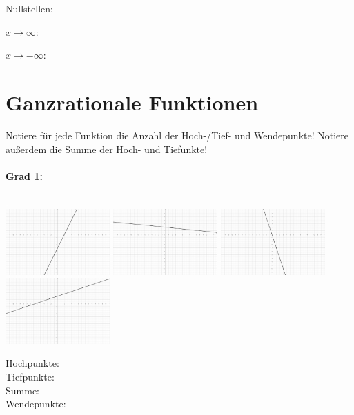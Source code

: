 \documentclass[12pt, parskip=half, a4paper, oneside]{scrartcl}
\begin{document}
\begin{addmargin}[-2cm]{0pt}
Nullstellen:

$x\rightarrow\infty:$

$x\rightarrow-\infty:$
\end{addmargin}

\newpage 

\section*{Ganzrationale Funktionen}
Notiere für jede Funktion die Anzahl der Hoch-/Tief- und Wendepunkte! Notiere außerdem die Summe der Hoch- und Tiefunkte!

\paragraph{Grad 1:}\textcolor{white}{.}\\
\includegraphics[width=4cm]{Bilder/G11}\hfill
\includegraphics[width=4cm]{Bilder/G12}\hfill
\includegraphics[width=4cm]{Bilder/G13}\hfill
\includegraphics[width=4cm]{Bilder/G14}

\begin{addmargin}[-2cm]{0pt}
Hochpunkte: \\
Tiefpunkte: \\
Summe: \\
Wendepunkte:
\end{addmargin}
\end{document}
